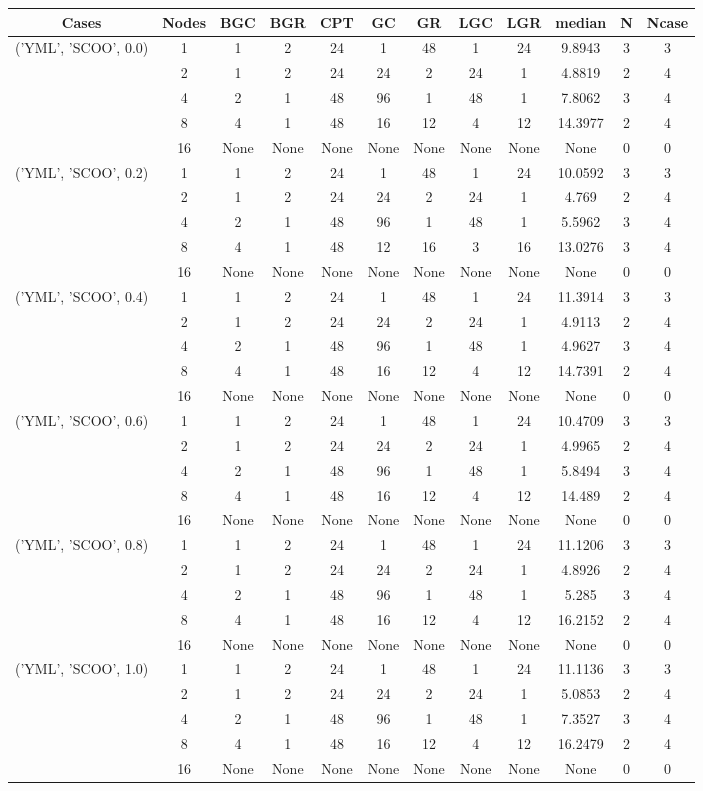 \begin{tabular}{cccccccccccc}
\hline
Cases & Nodes& BGC& BGR& CPT& GC& GR& LGC& LGR& median & N & Ncase \\
\hline
\multirow{5}{*}{('YML', 'SCOO', 0.0)}& 1& 1& 2& 24& 1& 48& 1& 24& 9.8943& 3& 3\\
& 2& 1& 2& 24& 24& 2& 24& 1& 4.8819& 2& 4\\
& 4& 2& 1& 48& 96& 1& 48& 1& 7.8062& 3& 4\\
& 8& 4& 1& 48& 16& 12& 4& 12& 14.3977& 2& 4\\
& 16& None& None& None& None& None& None& None& None& 0& 0\\
\hline
\multirow{5}{*}{('YML', 'SCOO', 0.2)}& 1& 1& 2& 24& 1& 48& 1& 24& 10.0592& 3& 3\\
& 2& 1& 2& 24& 24& 2& 24& 1& 4.769& 2& 4\\
& 4& 2& 1& 48& 96& 1& 48& 1& 5.5962& 3& 4\\
& 8& 4& 1& 48& 12& 16& 3& 16& 13.0276& 3& 4\\
& 16& None& None& None& None& None& None& None& None& 0& 0\\
\hline
\multirow{5}{*}{('YML', 'SCOO', 0.4)}& 1& 1& 2& 24& 1& 48& 1& 24& 11.3914& 3& 3\\
& 2& 1& 2& 24& 24& 2& 24& 1& 4.9113& 2& 4\\
& 4& 2& 1& 48& 96& 1& 48& 1& 4.9627& 3& 4\\
& 8& 4& 1& 48& 16& 12& 4& 12& 14.7391& 2& 4\\
& 16& None& None& None& None& None& None& None& None& 0& 0\\
\hline
\multirow{5}{*}{('YML', 'SCOO', 0.6)}& 1& 1& 2& 24& 1& 48& 1& 24& 10.4709& 3& 3\\
& 2& 1& 2& 24& 24& 2& 24& 1& 4.9965& 2& 4\\
& 4& 2& 1& 48& 96& 1& 48& 1& 5.8494& 3& 4\\
& 8& 4& 1& 48& 16& 12& 4& 12& 14.489& 2& 4\\
& 16& None& None& None& None& None& None& None& None& 0& 0\\
\hline
\multirow{5}{*}{('YML', 'SCOO', 0.8)}& 1& 1& 2& 24& 1& 48& 1& 24& 11.1206& 3& 3\\
& 2& 1& 2& 24& 24& 2& 24& 1& 4.8926& 2& 4\\
& 4& 2& 1& 48& 96& 1& 48& 1& 5.285& 3& 4\\
& 8& 4& 1& 48& 16& 12& 4& 12& 16.2152& 2& 4\\
& 16& None& None& None& None& None& None& None& None& 0& 0\\
\hline
\multirow{5}{*}{('YML', 'SCOO', 1.0)}& 1& 1& 2& 24& 1& 48& 1& 24& 11.1136& 3& 3\\
& 2& 1& 2& 24& 24& 2& 24& 1& 5.0853& 2& 4\\
& 4& 2& 1& 48& 96& 1& 48& 1& 7.3527& 3& 4\\
& 8& 4& 1& 48& 16& 12& 4& 12& 16.2479& 2& 4\\
& 16& None& None& None& None& None& None& None& None& 0& 0\\
\hline
\end{tabular}


